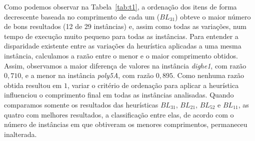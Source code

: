 \documentclass{article}
\begin{document}
Como podemos observar na Tabela~\ref{tab:t1}, a ordenação dos itens de forma decrescente baseada no comprimento de cada um ($BL_{31}$) obteve o maior número de bons resultados (12 de 29 instâncias) e, assim como todas as variações, num tempo de execução muito pequeno para todas as instâncias. Para entender a disparidade existente entre as variações da heurística aplicadas a uma mesma instância, calculamos a razão entre o menor e o maior comprimento obtidos. Assim, observamos a maior diferença de valores na instância {\it dighe1}, com razão $0,710$, e a menor na instância {\it poly5A}, com razão $0,895$. Como nenhuma razão obtida resultou em $1$, variar o critério de ordenação para aplicar a heurística influenciou o comprimento final em todas as instâncias analisadas. Quando comparamos somente os resultados das heurísticas $BL_{31}$, $BL_{21}$, $BL_{52}$ e $BL_{11}$, as quatro com melhores resultados, a classificação entre elas, de acordo com o número de instâncias em que obtiveram os menores comprimentos, permaneceu inalterada.
\end{document}

